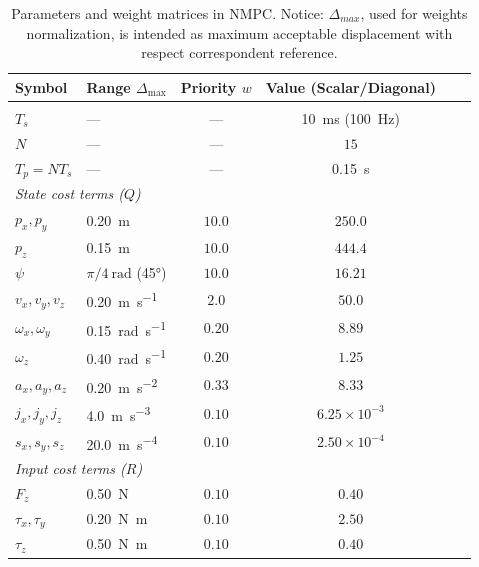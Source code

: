 \begin{table}[htbp]
\centering
\caption{Parameters and weight matrices in NMPC. Notice: $\Delta_{max}$, used for weights normalization, is intended as maximum acceptable displacement with respect correspondent reference.}
\label{tab:nmpc_parameters}
\small
\begin{tabular}{llcccc}
\toprule
 \textbf{Symbol} & \textbf{Range $\Delta_{\max}$} & \textbf{Priority $w$} & \textbf{Value (Scalar/Diagonal)} \\
\midrule
\multicolumn{4}{l}{} \\
$T_s$            & ---                                   & ---                   & \SI{10}{\milli\second} (\SI{100}{\hertz}) \\
$N$              & ---                                   & ---                   & $15$ \\
$T_p = N T_s$    & ---                                   & ---                   & \SI{0.15}{\second} \\
\midrule
\multicolumn{4}{l}{\textit{State cost terms ($Q$)}} \\
$p_{x}, p_{y}$   & \SI{0.20}{\meter}                     & $10.0$                & $250.0$ \\
$p_{z}$          & \SI{0.15}{\meter}                     & $10.0$                & $444.4$ \\
$\psi$           & $\pi/4\ \si{\radian}$ (\ang{45})      & $10.0$                & $16.21$ \\
$v_x, v_y, v_z$  & \SI{0.20}{\meter\per\second}          & $2.0$                 & $50.0$ \\
$\omega_x, \omega_y$ & \SI{0.15}{\radian\per\second}     & $0.20$                & $8.89$ \\
$\omega_z$       & \SI{0.40}{\radian\per\second}         & $0.20$                & $1.25$ \\
$a_x, a_y, a_z$  & \SI{0.20}{\meter\per\second\squared}  & $0.33$                & $8.33$ \\
$j_x, j_y, j_z$  & \SI{4.0}{\meter\per\second\cubed}     & $0.10$                & $6.25 \times 10^{-3}$ \\
$s_x, s_y, s_z$  & \SI{20.0}{\meter\per\second\tothe{4}} & $0.10$                & $2.50 \times 10^{-4}$ \\
\midrule
\multicolumn{4}{l}{\textit{Input cost terms ($R$)}} \\
$F_z$            & \SI{0.50}{\newton}                    & $0.10$                & $0.40$ \\
$\tau_x, \tau_y$ & \SI{0.20}{\newton\meter}              & $0.10$                & $2.50$ \\
$\tau_z$         & \SI{0.50}{\newton\meter}              & $0.10$                & $0.40$ \\
\bottomrule
\end{tabular}
\end{table}


